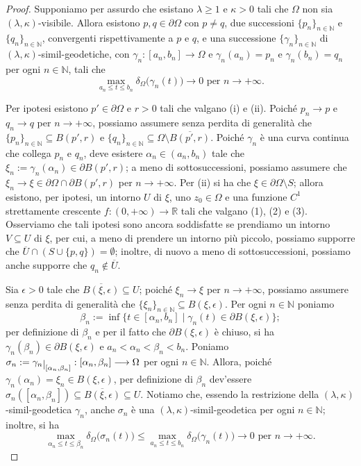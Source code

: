 \begin{proof}
    Supponiamo per assurdo che esistano $\lambda \ge 1$ e $\kappa>0$ tali che $\Omega$ non sia $(\lambda,\kappa)$-visibile. Allora esistono $p,q\in\partial\Omega$ con $p\not=q$, due successioni $\{p_n\}_{n\in\mathbb{N}}$ e $\{q_n\}_{n\in\mathbb{N}}$, convergenti rispettivamente a $p$ e $q$, e una successione $\{\gamma_n\}_{n\in\mathbb{N}}$ di $(\lambda,\kappa)$-simil-geodetiche, con $\gamma_n:[a_n,b_n]\longrightarrow\Omega$ e $\gamma_n(a_n)=p_n$ e $\gamma_n(b_n)=q_n$ per ogni $n\in\mathbb{N}$, tali che
    $$\max_{a_n\le t\le b_n}\delta_\Omega\big(\gamma_n(t)\big)\longrightarrow 0\text{ per }n\longrightarrow+\infty.$$

    Per ipotesi esistono $p'\in\partial\Omega$ e $r>0$ tali che valgano (i) e (ii). Poiché $p_n\longrightarrow p$ e $q_n\longrightarrow q$ per $n\longrightarrow+\infty$, possiamo assumere senza perdita di generalità che $\{p_n\}_{n\in\mathbb{N}}\subseteq B(p',r)$ e $\{q_n\}_{n\in\mathbb{N}}\subseteq \Omega\setminus\overline{B(p',r)}$. Poiché $\gamma_n$ è una curva continua che collega $p_n$ e $q_n$, deve esistere $\alpha_n\in(a_n,b_n)$ tale che $\xi_n:=\gamma_n(\alpha_n)\in\partial B(p',r)$; a meno di sottosuccessioni, possiamo assumere che $\xi_n\longrightarrow\xi\in\partial\Omega\cap\partial B(p',r)$ per $n\longrightarrow+\infty$. Per (ii) si ha che $\xi\in\partial\Omega\setminus S$; allora esistono, per ipotesi, un intorno $U$ di $\xi$, uno $z_0\in\Omega$ e una funzione $C^1$ strettamente crescente $f:(0,+\infty)\longrightarrow\mathbb{R}$ tali che valgano (1), (2) e (3). Osserviamo che tali ipotesi sono ancora soddisfatte se prendiamo un intorno $V \subseteq U$ di $\xi$, per cui, a meno di prendere un intorno più piccolo, possiamo supporre che $\overline{U}\cap(S\cup\{p,q\})=\emptyset$; inoltre, di nuovo a meno di sottosuccessioni, possiamo anche supporre che $q_n\not\in\overline{U}$.

    Sia $\epsilon>0$ tale che $\overline{B(\xi,\epsilon)}\subseteq U$; poiché $\xi_n\longrightarrow \xi$ per $n\longrightarrow+\infty$, possiamo assumere senza perdita di generalità che $\{\xi_n\}_{n\in\mathbb{N}}\subseteq B(\xi,\epsilon)$. Per ogni $n\in\mathbb{N}$ poniamo
    $$\beta_n:=\inf\{t\in[\alpha_n,b_n]\mid \gamma_n(t)\in\partial B(\xi,\epsilon)\};$$
    per definizione di $\beta_n$ e per il fatto che $\partial B(\xi,\epsilon)$ è chiuso, si ha $\gamma_n(\beta_n)\in\partial B(\xi,\epsilon)$ e $a_n<\alpha_n<\beta_n<b_n$. Poniamo $\sigma_n:=\gamma_n\restrict{[\alpha_n,\beta_n]}:[\alpha_n,\beta_n]\longrightarrow\Omega$ per ogni $n\in\mathbb{N}$. Allora, poiché $\gamma_n(\alpha_n)=\xi_n\in B(\xi,\epsilon)$, per definizione di $\beta_n$ dev'essere $\sigma_n([\alpha_n,\beta_n])\subseteq\overline{B(\xi,\epsilon)}\subseteq U$. Notiamo che, essendo la restrizione della $(\lambda,\kappa)$-simil-geodetica $\gamma_n$, anche $\sigma_n$ è una $(\lambda,\kappa)$-simil-geodetica per ogni $n\in\mathbb{N}$; inoltre, si ha
    $$\max_{\alpha_n\le t\le \beta_n}\delta_\Omega\big(\sigma_n(t)\big)\le\max_{a_n\le t\le b_n}\delta_\Omega\big(\gamma_n(t)\big)\longrightarrow 0\text{ per }n\longrightarrow+\infty.$$


\end{proof}
